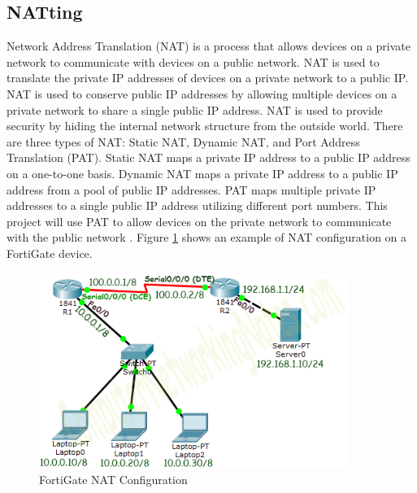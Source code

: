 \documentclass[12pt]{report}
\begin{document}
\subsection{NATting}
Network Address Translation (NAT) is a process that allows devices on a private network to communicate with devices on a public network. NAT is used to translate the private IP addresses of devices on a private network to a public IP. NAT is used to conserve public IP addresses by allowing multiple devices on a private network to share a single public IP address. NAT is used to provide security by hiding the internal network structure from the outside world. There are three types of NAT: Static NAT, Dynamic NAT, and Port Address Translation (PAT). Static NAT maps a private IP address to a public IP address on a one-to-one basis. Dynamic NAT maps a private IP address to a public IP address from a pool of public IP addresses. PAT maps multiple private IP addresses to a single public IP address utilizing different port numbers. This project will use PAT to allow devices on the private network to communicate with the public network \cite{NATTing}. Figure \ref{fig:NAT} shows an example of NAT configuration on a FortiGate device.
\begin{figure}[h]
    \centering
    \includegraphics[width=0.9\textwidth]{images/nat.png}
    \caption{FortiGate NAT Configuration \cite{NATIMG}}
    \label{fig:NAT}
\end{figure}
\end{document}
